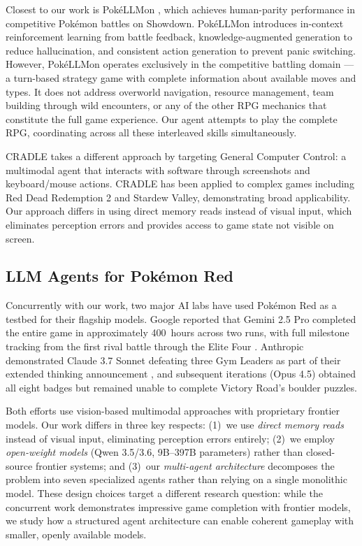 \documentclass{article}
\begin{document}
Closest to our work is Pok\'{e}LLMon \citep{hu2024pokellmon}, which achieves human-parity performance in competitive Pok\'{e}mon battles on Showdown. Pok\'{e}LLMon introduces in-context reinforcement learning from battle feedback, knowledge-augmented generation to reduce hallucination, and consistent action generation to prevent panic switching. However, Pok\'{e}LLMon operates exclusively in the competitive battling domain --- a turn-based strategy game with complete information about available moves and types. It does not address overworld navigation, resource management, team building through wild encounters, or any of the other RPG mechanics that constitute the full game experience. Our agent attempts to play the complete RPG, coordinating across all these interleaved skills simultaneously.

CRADLE \citep{tan2024cradle} takes a different approach by targeting General Computer Control: a multimodal agent that interacts with software through screenshots and keyboard/mouse actions. CRADLE has been applied to complex games including Red Dead Redemption 2 and Stardew Valley, demonstrating broad applicability. Our approach differs in using direct memory reads instead of visual input, which eliminates perception errors and provides access to game state not visible on screen.

\subsection{LLM Agents for Pok\'{e}mon Red}

Concurrently with our work, two major AI labs have used Pok\'{e}mon Red as a testbed for their flagship models. Google reported that Gemini 2.5 Pro completed the entire game in approximately 400~hours across two runs, with full milestone tracking from the first rival battle through the Elite Four \citep{gemini25}. Anthropic demonstrated Claude 3.7 Sonnet defeating three Gym Leaders as part of their extended thinking announcement \citep{anthropic2025pokemon}, and subsequent iterations (Opus 4.5) obtained all eight badges but remained unable to complete Victory Road's boulder puzzles.

Both efforts use vision-based multimodal approaches with proprietary frontier models. Our work differs in three key respects: (1)~we use \emph{direct memory reads} instead of visual input, eliminating perception errors entirely; (2)~we employ \emph{open-weight models} (Qwen 3.5/3.6, 9B--397B parameters) rather than closed-source frontier systems; and (3)~our \emph{multi-agent architecture} decomposes the problem into seven specialized agents rather than relying on a single monolithic model. These design choices target a different research question: while the concurrent work demonstrates impressive game completion with frontier models, we study how a structured agent architecture can enable coherent gameplay with smaller, openly available models.
\end{document}

